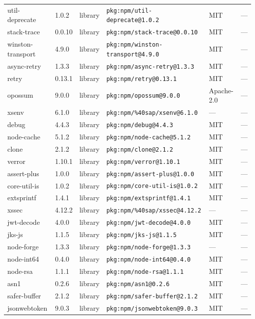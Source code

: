 \documentclass[11pt]{article}
\begin{document}
\begin{longtable}{|l|l|l|p{2.2cm}|l|p{4cm}|}
util-deprecate & 1.0.2 & library & \texttt{pkg:npm/util-deprecate@1.0.2} & MIT & — \\
stack-trace & 0.0.10 & library & \texttt{pkg:npm/stack-trace@0.0.10} & MIT & — \\
winston-transport & 4.9.0 & library & \texttt{pkg:npm/winston-transport@4.9.0} & MIT & — \\
async-retry & 1.3.3 & library & \texttt{pkg:npm/async-retry@1.3.3} & MIT & — \\
retry & 0.13.1 & library & \texttt{pkg:npm/retry@0.13.1} & MIT & — \\
opossum & 9.0.0 & library & \texttt{pkg:npm/opossum@9.0.0} & Apache-2.0 & — \\
xsenv & 6.1.0 & library & \texttt{pkg:npm/\%40sap/xsenv@6.1.0} & — & — \\
debug & 4.4.3 & library & \texttt{pkg:npm/debug@4.4.3} & MIT & — \\
node-cache & 5.1.2 & library & \texttt{pkg:npm/node-cache@5.1.2} & MIT & — \\
clone & 2.1.2 & library & \texttt{pkg:npm/clone@2.1.2} & MIT & — \\
verror & 1.10.1 & library & \texttt{pkg:npm/verror@1.10.1} & MIT & — \\
assert-plus & 1.0.0 & library & \texttt{pkg:npm/assert-plus@1.0.0} & MIT & — \\
core-util-is & 1.0.2 & library & \texttt{pkg:npm/core-util-is@1.0.2} & MIT & — \\
extsprintf & 1.4.1 & library & \texttt{pkg:npm/extsprintf@1.4.1} & MIT & — \\
xssec & 4.12.2 & library & \texttt{pkg:npm/\%40sap/xssec@4.12.2} & — & — \\
jwt-decode & 4.0.0 & library & \texttt{pkg:npm/jwt-decode@4.0.0} & MIT & — \\
jks-js & 1.1.5 & library & \texttt{pkg:npm/jks-js@1.1.5} & MIT & — \\
node-forge & 1.3.3 & library & \texttt{pkg:npm/node-forge@1.3.3} & — & — \\
node-int64 & 0.4.0 & library & \texttt{pkg:npm/node-int64@0.4.0} & MIT & — \\
node-rsa & 1.1.1 & library & \texttt{pkg:npm/node-rsa@1.1.1} & MIT & — \\
asn1 & 0.2.6 & library & \texttt{pkg:npm/asn1@0.2.6} & MIT & — \\
safer-buffer & 2.1.2 & library & \texttt{pkg:npm/safer-buffer@2.1.2} & MIT & — \\
jsonwebtoken & 9.0.3 & library & \texttt{pkg:npm/jsonwebtoken@9.0.3} & MIT & — \\

\end{longtable}
\end{document}
